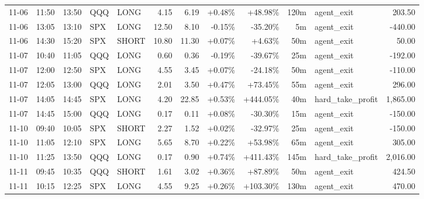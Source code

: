 \documentclass[11pt,a4paper,twoside]{article}
\begin{document}
\begin{center}
\begin{longtable}{>{\color{txtmain}}l l l l l r r r r r >{\color{txtmain}}l r}
11-06 & 11:50 & 13:50 & QQQ & LONG & 4.15 & 6.19 & \textcolor{wingreen}{+0.48\%} & \textcolor{wingreen}{+48.98\%} & 120m & agent\_exit & \textcolor{wingreen}{203.50} \\
11-06 & 13:05 & 13:10 & SPX & LONG & 12.50 & 8.10 & \textcolor{lossred}{-0.15\%} & \textcolor{lossred}{-35.20\%} & 5m & agent\_exit & \textcolor{lossred}{-440.00} \\
11-06 & 14:30 & 15:20 & SPX & SHORT & 10.80 & 11.30 & \textcolor{wingreen}{+0.07\%} & \textcolor{wingreen}{+4.63\%} & 50m & agent\_exit & \textcolor{wingreen}{50.00} \\
11-07 & 10:40 & 11:05 & QQQ & LONG & 0.60 & 0.36 & \textcolor{lossred}{-0.19\%} & \textcolor{lossred}{-39.67\%} & 25m & agent\_exit & \textcolor{lossred}{-192.00} \\
11-07 & 12:00 & 12:50 & SPX & LONG & 4.55 & 3.45 & \textcolor{wingreen}{+0.07\%} & \textcolor{lossred}{-24.18\%} & 50m & agent\_exit & \textcolor{lossred}{-110.00} \\
11-07 & 12:05 & 13:00 & QQQ & LONG & 2.01 & 3.50 & \textcolor{wingreen}{+0.47\%} & \textcolor{wingreen}{+73.45\%} & 55m & agent\_exit & \textcolor{wingreen}{296.00} \\
11-07 & 14:05 & 14:45 & SPX & LONG & 4.20 & 22.85 & \textcolor{wingreen}{+0.53\%} & \textcolor{wingreen}{+444.05\%} & 40m & hard\_take\_profit & \textcolor{wingreen}{1,865.00} \\
11-07 & 14:45 & 15:00 & QQQ & LONG & 0.17 & 0.11 & \textcolor{wingreen}{+0.08\%} & \textcolor{lossred}{-30.30\%} & 15m & agent\_exit & \textcolor{lossred}{-150.00} \\
11-10 & 09:40 & 10:05 & SPX & SHORT & 2.27 & 1.52 & \textcolor{wingreen}{+0.02\%} & \textcolor{lossred}{-32.97\%} & 25m & agent\_exit & \textcolor{lossred}{-150.00} \\
11-10 & 11:05 & 12:10 & SPX & LONG & 5.65 & 8.70 & \textcolor{wingreen}{+0.22\%} & \textcolor{wingreen}{+53.98\%} & 65m & agent\_exit & \textcolor{wingreen}{305.00} \\
11-10 & 11:25 & 13:50 & QQQ & LONG & 0.17 & 0.90 & \textcolor{wingreen}{+0.74\%} & \textcolor{wingreen}{+411.43\%} & 145m & hard\_take\_profit & \textcolor{wingreen}{2,016.00} \\
11-11 & 09:45 & 10:35 & QQQ & SHORT & 1.61 & 3.02 & \textcolor{wingreen}{+0.36\%} & \textcolor{wingreen}{+87.89\%} & 50m & agent\_exit & \textcolor{wingreen}{424.50} \\
11-11 & 10:15 & 12:25 & SPX & LONG & 4.55 & 9.25 & \textcolor{wingreen}{+0.26\%} & \textcolor{wingreen}{+103.30\%} & 130m & agent\_exit & \textcolor{wingreen}{470.00} \\

\end{longtable}
\end{center}
\end{document}
